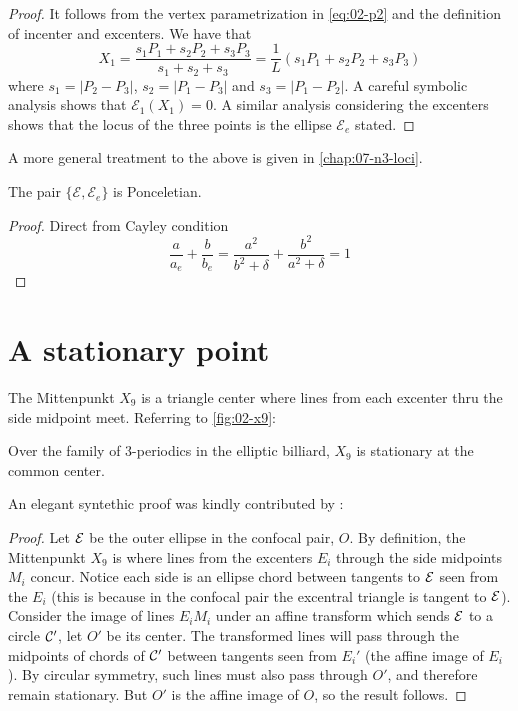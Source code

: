 \begin{proof}
It follows from the vertex parametrization in \cref{eq:02-p2} and the definition of incenter and excenters. We have that
\[X_1=\frac{s_1 P_1+s_2P_2+s_3P_3}{s_1+s_2+s_3}=
\frac{1}{L}(s_1P_1+s_2P_2+s_3P_3)\]
where $s_1=|P_2-P_3|$, $s_2=|P_1-P_3|$ and $s_3=|P_1-P_2|$.
A careful symbolic analysis shows that $\mathcal{E}_1(X_1)=0$. A similar analysis considering the excenters shows that the locus of the three points is the ellipse $\mathcal{E}_e$ stated.
\end{proof}

\noindent A more general treatment to the above is given in \cref{chap:07-n3-loci}.

\begin{corollary}
The pair $\{\mathcal{E},\mathcal{E}_e\}$ is Ponceletian.
\label{cor:02-excentral-billiard-poncelet}
\end{corollary}

\begin{proof}
Direct from Cayley condition
\[\frac{a}{a_e}+\frac{b}{b_e}=\frac{a^2}{b^2+\delta}+\frac{b^2}{a^2+\delta}= 1\]

\end{proof}

\section{A stationary point}
\label{sec:02-stationary}

The Mittenpunkt $X_9$ is a triangle center where lines from each excenter thru the side midpoint meet. Referring to \cref{fig:02-x9}:
\begin{theorem}
Over the family of 3-periodics in the elliptic billiard, $X_9$ is stationary at the common center.
\end{theorem}

An elegant syntethic proof was kindly contributed by \cite{olga19_mitten}:

\begin{proof}
Let $\mathcal{E}$ be the outer ellipse in the confocal pair, $O$. By definition, the Mittenpunkt $X_9$ is where lines from the excenters $E_i$ through the side midpoints $M_i$ concur. Notice each side is an ellipse chord between tangents to $\mathcal{E}$ seen from the $E_i$ (this is because in the confocal pair the excentral triangle is tangent to $\mathcal{E}$). Consider the image of lines $E_i M_i$ under an affine transform which sends $\mathcal{E}$ to a circle $\mathcal{C}'$, let $O'$ be its center. The transformed lines will pass through the midpoints of chords of $\mathcal{C}'$ between tangents seen from $E_i'$ (the affine image of $E_i$). By circular symmetry, such lines must also pass through $O'$, and therefore remain stationary. But $O'$ is the affine image of $O$, so the result follows.
\end{proof}

